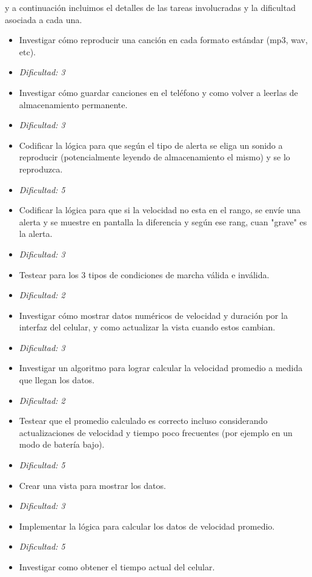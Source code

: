 \documentclass[10pt, a4paper,english,spanish]{article}
\begin{document}
y a continuaci\'on incluimos el detalles de las tareas involucradas y la dificultad asociada a cada una.

\begin{itemize}
	\itemsep 0em
	\item Investigar cómo reproducir una canción en cada formato estándar (mp3,
	wav, etc).
	\item[] \hfill \textit{Dificultad: 3}
	\item Investigar cómo guardar canciones en el teléfono y como volver a leerlas de almacenamiento permanente.
	\item[] \hfill \textit{Dificultad: 3}
	\item Codificar la lógica para que según el tipo de alerta se eliga un sonido a reproducir (potencialmente leyendo de almacenamiento el mismo) y se lo reproduzca. 
	\item[] \hfill \textit{Dificultad: 5}
	\item Codificar la lógica para que si la velocidad no esta en el rango, se envíe una alerta y se muestre en pantalla la diferencia y según ese rang, cuan "grave" es la alerta.
	\item[] \hfill \textit{Dificultad: 3}
	\item Testear para los 3 tipos de condiciones de marcha válida e inválida.
	\item[] \hfill \textit{Dificultad: 2}
	\item Investigar cómo mostrar datos numéricos de velocidad y duración por la interfaz del celular, y como actualizar la vista cuando estos cambian.
	\item[] \hfill \textit{Dificultad: 3}
	\item Investigar un algoritmo para lograr calcular la velocidad promedio a medida que llegan los datos.
	\item[] \hfill \textit{Dificultad: 2}
	\item Testear que el promedio calculado es correcto incluso considerando actualizaciones de velocidad y tiempo poco frecuentes 
		(por ejemplo en un modo de batería bajo).
	\item[] \hfill \textit{Dificultad: 5}
	\item Crear una vista para mostrar los datos.
	\item[] \hfill \textit{Dificultad: 3}
	\item Implementar la lógica para calcular los datos de velocidad promedio.
	\item[] \hfill \textit{Dificultad: 5}
	\item  Investigar como obtener el tiempo actual del celular.

\end{itemize}
\end{document}
